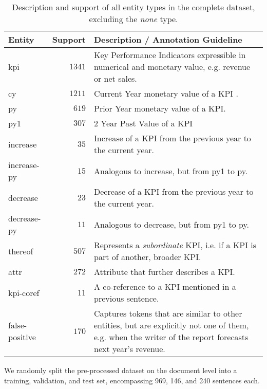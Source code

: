 \documentclass[conference, table]{IEEEtran}
\newcommand{\1} {\mathbbm{1}}
\begin{document}
\begin{table}[t]
\scriptsize
\renewcommand\tabularxcolumn[1]{m{#1}}
\begin{tabularx}{\linewidth}{l@{\hspace{1em}}r@{\hspace{1em}}X} \toprule
\rowcolor{white} Entity &  Support & Description / Annotation Guideline \\
\midrule
kpi             & $1341$ & Key Performance Indicators expressible in numerical and monetary value, e.g. revenue or net sales.\\
cy              & $1211$ & Current Year monetary value of a KPI
.
\\
py              & $619$ & Prior Year monetary value of a KPI.\\
py1             & $307$ & 2 Year Past Value of a KPI \\
increase        & $35$ & Increase of a KPI from the previous year to the current year.\\
increase-py     & $15$ & Analogous to increase, but from py1 to py.\\
decrease        & $23$ & Decrease of a KPI from the previous year to the current year.\\
decrease-py     & $11$ & Analogous to decrease, but from py1 to py.\\
thereof           & $507$ & Represents a \textit{subordinate} KPI, i.e. if a KPI is part of another, broader KPI.\\
attr            & $272$ & Attribute that further describes a KPI.\\
kpi-coref       & $11$ & A co-reference to a KPI mentioned in a previous sentence.\\
false-positive  & $170$ & Captures tokens that are similar to other entities, but are explicitly not one of them, e.g. when the writer of the report forecasts next year's revenue.\\
\bottomrule
\end{tabularx}


%
 \caption{Description and support of all entity types in the complete dataset, excluding the \textit{none} type.}
\label{tab:entities}
\end{table}



We randomly split the pre-processed dataset on the document
level into a training, validation, and test set, encompassing
969, 146, and 240 sentences each. 
\end{document}
